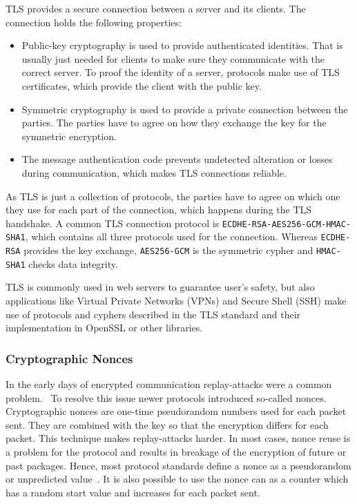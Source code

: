 TLS provides a secure connection between a server and its clients. The
connection holds the following properties:
\begin{itemize}
  \item Public-key cryptography is used to provide authenticated identities.
  That is usually just needed for clients to make sure they communicate with the
  correct server. To proof the identity of a server, protocols make use of TLS
  certificates, which provide the client with the public key.
  \item Symmetric cryptography is used to provide a private connection between
  the parties. The parties have to agree on how they exchange the key for the
  symmetric encryption.
  \item The message authentication code prevents undetected alteration
  or losses during communication, which makes TLS connections reliable.
\end{itemize}

As TLS is just a collection of protocols, the parties have to agree on which one
they use for each part of the connection, which happens during the TLS
handshake. A common TLS connection protocol is
\texttt{ECDHE-RSA-AES256-GCM-HMAC-SHA1}, which contains all three protocols used
for the connection. Whereas \texttt{ECDHE-RSA} provides the key exchange,
\texttt{AES256-GCM} is the  symmetric cypher and \texttt{HMAC-SHA1} checks data
integrity.

TLS is commonly used in web servers to guarantee user's safety, but also
applications like Virtual Private Networks (VPNs) and Secure Shell (SSH) make
use of protocols and cyphers described in the TLS standard and their
implementation in OpenSSL or other libraries.


\subsubsection{Cryptographic Nonces}

In the early days of encrypted communication replay-attacks were a common
problem.~ To resolve this issue newer
protocols introduced so-called nonces. Cryptographic nonces are one-time
pseudorandom numbers used for each packet sent. They are combined with the key
so that the encryption differs for each packet. This technique makes
replay-attacks harder. In most cases, nonce reuse is a problem for the protocol
and results in breakage of the encryption of future or past packages. Hence,
most protocol standards define a nonce as a pseudorandom or unpredicted
value~\cite{noncegeneral}. It is also possible to use the nonce can as a counter
which has a random start value and increases for each packet sent.

